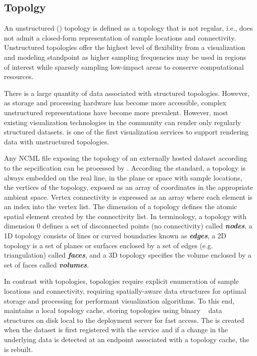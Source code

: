 \subsection{\ugrid{} Topolgy}
An unstructured (\ugrid{}) topology is defined as a topology that is
not regular, i.e., does not admit a closed-form representation of
sample locations and connectivity. Unstructured topologies offer the
highest level of flexibility from a visualization and modeling
standpoint as higher sampling frequencies may be used in regions of
interest while sparsely sampling low-impact areas to conserve
computational resources. 

There is a large quantity of \cf{} data associated with structured
topologies. However, as storage and processing hardware has become
more accessible, complex unstructured representations have become more
prevalent. However, most existing visualization technologies in the
\cf{} community can render only regularly structured
datasets. \sciwms{} is one of the first visualization services to
support rendering data with unstructured topologies.

Any NCML file exposing the topology of an externally hosted dataset
according to the \cfugrid{} sepcification can be processed by
\sciwms{}. According the \cfugrid{} standard, a topology is always
embedded on the real line, in the plane or space with sample
locations, the vertices of the topology, exposed as an array of
coordinates in the appropriate ambient space. Vertex connectivity is
expressed as an array where each element is an index into the vertex
list. The dimension of a topology defines the atomic spatial element
created by the connectivity list. In \cfugrid{} terminology, a
topology with dimension 0 defines a set of disconnected points (no
connectivity) called \textbf{\textit{nodes}}, a 1D topology consists
of lines or curved boundaries known as \textbf{\textit{edges}}, a 2D
topology is a set of planes or surfaces enclosed by a set of edges
(e.g. triangulation) called \textbf{\textit{faces}}, and a 3D topology
specifies the volume enclosed by a set of faces called
\textbf{\textit{volumes}}.

In contrast with \cgrid{} topologies, \ugrid{} topologies require
explicit enumeration of sample locations and connectivity, requiring
spatially-aware data structures for optimal storage and processing for
performant visualization algorithms. To this end, \sciwms{} maintains
a local topology cache, storing \ugrid{} topologies using binary
\rtree{}~\cite{Guttman84} data structures on disk local to the
deployment server for fast access. The \rtree{} is created when the
dataset is first registered with the \sciwms{} service and if a change in
the underlying data is detected at an endpoint associated with a
topology cache, the \rtree{} is rebuilt.
